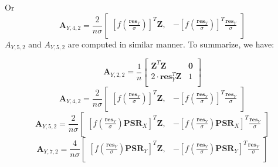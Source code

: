 \documentclass[]{article}
\begin{document}
Or
\[
\pmb{A}_{Y,4,2} = \frac{2}{n\sigma}\begin{bmatrix}
   \left[f\left(\frac{\pmb{res}_Y}{\sigma}\right)\right]^T \pmb{Z}, &
   -\left[f\left(\frac{\pmb{res}_Y}{\sigma}\right)\right]^T \frac{\pmb{res}_Y}{\sigma} \\
\end{bmatrix}
\]
$A_{Y,5,2}$ and  $A_{Y,5,2}$ are computed in similar manner. To summarize, we have:

\[
\pmb{A}_{Y,2,2} = \frac{1}{n}
\begin{bmatrix}
  \pmb{Z}^T\pmb{Z} & \pmb{0}\\
  2 \cdot \pmb{res}_Y^T\pmb{Z} & 1\\
  \end{bmatrix}
\]
\[
\pmb{A}_{Y,4,2} = \frac{2}{n\sigma}\begin{bmatrix}
   \left[f\left(\frac{\pmb{res}_Y}{\sigma}\right)\right]^T \pmb{Z}, &
   -\left[f\left(\frac{\pmb{res}_Y}{\sigma}\right)\right]^T \frac{\pmb{res}_Y}{\sigma} \\
\end{bmatrix}
\]
\[
\pmb{A}_{Y,5,2} = \frac{2}{n\sigma}\begin{bmatrix}
   \left[f\left(\frac{\pmb{res}_Y}{\sigma}\right)\pmb{PSR}_X\right]^T \pmb{Z}, &
   -\left[f\left(\frac{\pmb{res}_Y}{\sigma}\right)\pmb{PSR}_X\right]^T \frac{\pmb{res}_Y}{\sigma} \\
\end{bmatrix}
\]
\[
\pmb{A}_{Y,7,2} = \frac{4}{n\sigma}\begin{bmatrix}
   \left[f\left(\frac{\pmb{res}_Y}{\sigma}\right)\pmb{PSR}_Y\right]^T \pmb{Z}, &
   -\left[f\left(\frac{\pmb{res}_Y}{\sigma}\right)\pmb{PSR}_Y\right]^T \frac{\pmb{res}_Y}{\sigma} \\
\end{bmatrix}
\]
\end{document}
